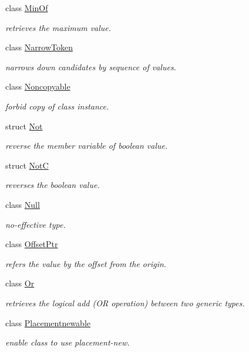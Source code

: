 \begin{DoxyCompactItemize}
class \hyperlink{classhryky_1_1_min_of}{Min\-Of}
\begin{DoxyCompactList}\small\item\em retrieves the maximum value. \end{DoxyCompactList}\item 
class \hyperlink{classhryky_1_1_narrow_token}{Narrow\-Token}
\begin{DoxyCompactList}\small\item\em narrows down candidates by sequence of values. \end{DoxyCompactList}\item 
class \hyperlink{classhryky_1_1_noncopyable}{Noncopyable}
\begin{DoxyCompactList}\small\item\em forbid copy of class instance. \end{DoxyCompactList}\item 
struct \hyperlink{structhryky_1_1_not}{Not}
\begin{DoxyCompactList}\small\item\em reverse the member variable of boolean value. \end{DoxyCompactList}\item 
struct \hyperlink{structhryky_1_1_not_c}{Not\-C}
\begin{DoxyCompactList}\small\item\em reverses the boolean value. \end{DoxyCompactList}\item 
class \hyperlink{classhryky_1_1_null}{Null}
\begin{DoxyCompactList}\small\item\em no-\/effective type. \end{DoxyCompactList}\item 
class \hyperlink{classhryky_1_1_offset_ptr}{Offset\-Ptr}
\begin{DoxyCompactList}\small\item\em refers the value by the offset from the origin. \end{DoxyCompactList}\item 
class \hyperlink{classhryky_1_1_or}{Or}
\begin{DoxyCompactList}\small\item\em retrieves the logical add (O\-R operation) between two generic types. \end{DoxyCompactList}\item 
class \hyperlink{classhryky_1_1_placementnewable}{Placementnewable}
\begin{DoxyCompactList}\small\item\em enable class to use placement-\/new. \end{DoxyCompactList}\item 

\end{DoxyCompactItemize}
